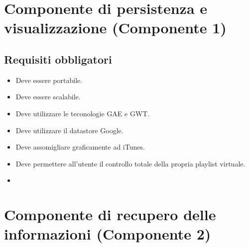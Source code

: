 \section{Componente di persistenza e visualizzazione (Componente 1)}
\subsection{Requisiti obbligatori}
\begin{itemize}
  \item Deve essere portabile.
  \item Deve essere scalabile.
  \item Deve utilizzare le teconologie GAE e GWT.
  \item Deve utilizzare il datastore Google.
  \item Deve assomigliare graficamente ad iTunes.
  \item Deve permettere all'utente il controllo totale della propria playlist
  virtuale.
  \item 
\end{itemize}
\section{Componente di recupero delle informazioni (Componente 2)}

